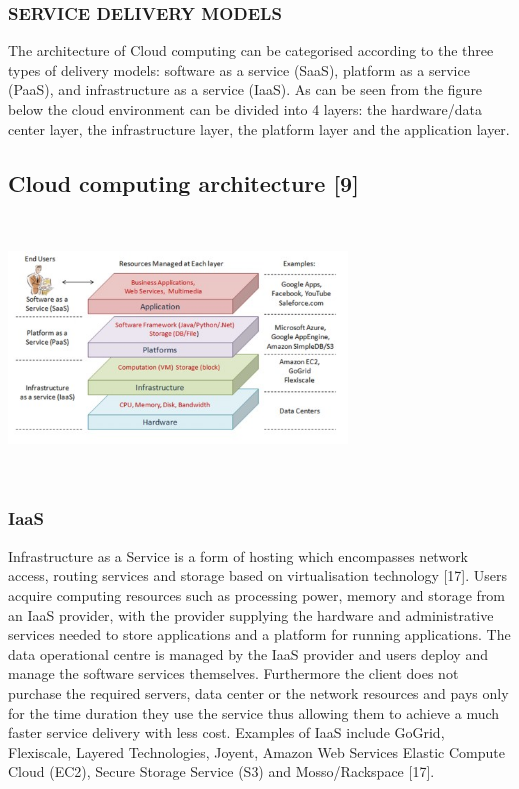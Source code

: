 \documentclass[10pt,journal,compsoc]{IEEEtran}
\begin{document}
\subsubsection{SERVICE DELIVERY MODELS}
\vspace{2mm}
The architecture of Cloud computing can be categorised according to the three types of delivery models: software as a service (SaaS), platform as a service (PaaS), and infrastructure as a service (IaaS). As can be seen from the figure below the cloud environment can be divided into 4 layers: the hardware/data center layer, the infrastructure layer, the platform layer and the application layer.



\subsection{Cloud computing architecture [9]}
\vspace{2mm}

\includegraphics[height=7cm,width=9cm]{cloudCompArch.jpg}





\subsubsection{IaaS}
\vspace{2mm}
Infrastructure as a Service is a form of hosting which encompasses network access, routing services and storage based on virtualisation technology [17]. Users acquire computing resources such as processing power, memory and storage from an IaaS provider, with the provider supplying the hardware and administrative services needed to store applications and a platform for running applications. The data operational centre is managed by the IaaS provider and users deploy and manage the software services themselves. Furthermore the client does not purchase the required servers, data center or the network resources and pays only for the time duration they use the service thus allowing them to achieve a much faster service delivery with less cost. Examples of IaaS include GoGrid, Flexiscale, Layered Technologies, Joyent, Amazon Web Services Elastic Compute Cloud (EC2), Secure Storage Service (S3) and Mosso/Rackspace [17].
\end{document}
